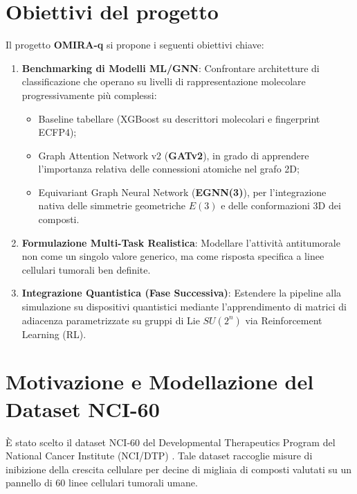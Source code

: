\documentclass[12pt, a4paper]{article}
\begin{document}
\section{Obiettivi del progetto}
Il progetto \textbf{OMIRA-q} si propone i seguenti obiettivi chiave:
\begin{enumerate}
    \item \textbf{Benchmarking di Modelli ML/GNN}: Confrontare architetture di classificazione che operano su livelli di rappresentazione molecolare progressivamente più complessi:
    \begin{itemize}
        \item Baseline tabellare (XGBoost su descrittori molecolari e fingerprint ECFP4);
        \item Graph Attention Network v2 (\textbf{GATv2}), in grado di apprendere l'importanza relativa delle connessioni atomiche nel grafo 2D;
        \item Equivariant Graph Neural Network (\textbf{EGNN(3)}), per l'integrazione nativa delle simmetrie geometriche $E(3)$ e delle conformazioni 3D dei composti.
    \end{itemize}
    \item \textbf{Formulazione Multi-Task Realistica}: Modellare l'attività antitumorale non come un singolo valore generico, ma come risposta specifica a linee cellulari tumorali ben definite.
    \item \textbf{Integrazione Quantistica (Fase Successiva)}: Estendere la pipeline alla simulazione su dispositivi quantistici mediante l'apprendimento di matrici di adiacenza parametrizzate su gruppi di Lie $SU(2^n)$ via Reinforcement Learning (RL).
\end{enumerate}

\section{Motivazione e Modellazione del Dataset NCI-60}
È stato scelto il dataset NCI-60 del Developmental Therapeutics Program del National Cancer Institute (NCI/DTP) \cite{shoemaker2006nci60}. Tale dataset raccoglie misure di inibizione della crescita cellulare per decine di migliaia di composti valutati su un pannello di 60 linee cellulari tumorali umane.
\end{document}
